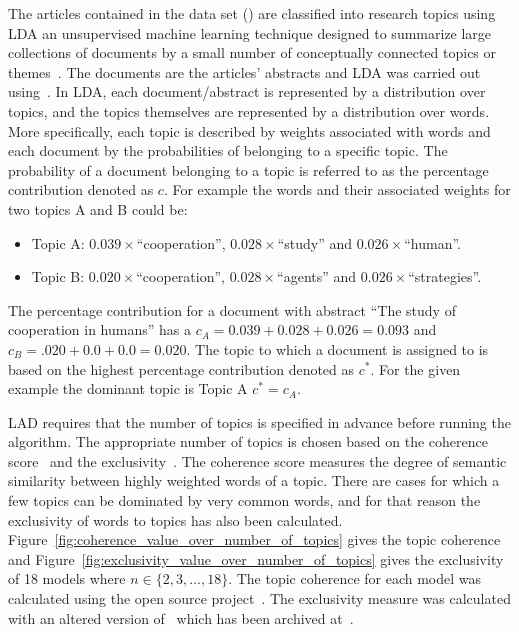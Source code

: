 \documentclass{article}
\theoremstyle{definition}
\begin{document}
The articles contained in the data set (\cite{pd_data_2018}) are classified
into research topics using LDA an unsupervised machine learning technique
designed to summarize large collections of documents by a small number of
conceptually connected topics or themes~\cite{Blei2003, Grimmer2013}. The
documents are the articles' abstracts and LDA was carried out using~\cite{rehurek_lrec}.
In LDA, each document/abstract is represented by a distribution over topics,
and the topics themselves are represented by a distribution over words. More
specifically, each topic is described by weights associated with words and
each document by the probabilities of belonging to a specific topic. The
probability of a document belonging to a topic is referred to as the percentage
contribution denoted as \(c\). For example the words and their associated
weights for two topics A and B could be:

\begin{itemize}
    \item Topic A: \(0.039 \times\)``cooperation'', \(0.028 \times\)``study'' and \(0.026 \times\)``human''.
    \item Topic B: \(0.020 \times\)``cooperation'', \(0.028 \times\)``agents'' and
    \(0.026 \times\)``strategies''.
\end{itemize}

The percentage contribution for a document with abstract ``The study of
cooperation in humans'' has a \(c_{A} = 0.039 + 0.028 + 0.026 = 0.093\) and
\(c_B = .020 + 0.0 + 0.0 = 0.020\). The topic to which a document is assigned to
is based on the highest percentage contribution denoted as \(c^*\). For the
given example the dominant topic is Topic A \(c^*=c_A\).

LAD requires that the number of topics is specified in advance before running
the algorithm. The appropriate number of topics is chosen based on the
coherence score~\cite{Roder2015} and the exclusivity~\cite{Airoldi2012}. The
coherence score measures the degree of semantic similarity between highly weighted
words of a topic. There are cases for which a few topics can be dominated by very
common words, and for that reason the exclusivity of words to topics has also
been calculated.
Figure~\ref{fig:coherence_value_over_number_of_topics} gives the topic coherence
and Figure~\ref{fig:exclusivity_value_over_number_of_topics} gives the
exclusivity of 18 models where \(n \in \{2, 3, \dots, 18\}\).
The topic coherence for each model was calculated using the
open source project~\cite{rehurek_lrec}. The exclusivity measure was calculated
with an altered version of~\cite{rehurek_lrec} which has been archived
at~\cite{gensim_nikoleta}.
\end{document}
